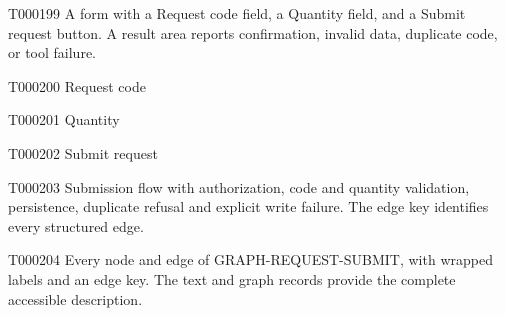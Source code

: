 \documentclass[11pt,a4paper]{article}
\begin{document}
\begin{atlasparagraph}{T000199}
A form with a Request code field, a Quantity field, and a Submit request button. A result area reports confirmation, invalid data, duplicate code, or tool failure.
\end{atlasparagraph}
\begin{atlasitem}{T000200}
Request code
\end{atlasitem}
\begin{atlasitem}{T000201}
Quantity
\end{atlasitem}
\begin{atlasitem}{T000202}
Submit request
\end{atlasitem}
\begin{atlasparagraph}{T000203}
Submission flow with authorization, code and quantity validation, persistence, duplicate refusal and explicit write failure. The edge key identifies every structured edge.
\end{atlasparagraph}
\begin{atlasparagraph}{T000204}
Every node and edge of GRAPH-REQUEST-SUBMIT, with wrapped labels and an edge key. The text and graph records provide the complete accessible description.
\end{atlasparagraph}
\end{document}
